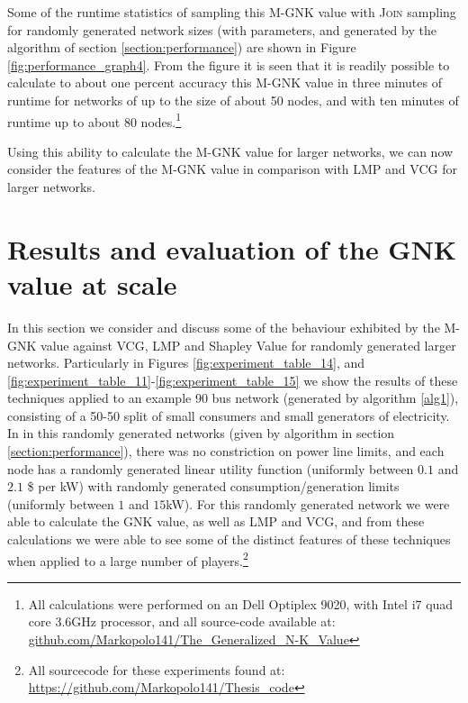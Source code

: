 Some of the runtime statistics of sampling this M-GNK value with \textsc{Join} sampling for randomly generated network sizes (with parameters, and generated by the algorithm of section \ref{section:performance}) are shown in Figure \ref{fig:performance_graph4}.
From the figure it is seen that it is readily possible to calculate to about one percent accuracy this M-GNK value in three minutes of runtime for networks of up to the size of about 50 nodes, and with ten minutes of runtime up to about 80 nodes.\footnote{\label{note1} All calculations were performed on an Dell Optiplex 9020, with Intel i7 quad core 3.6GHz processor, and all source-code available at:\\
\href{https://github.com/Markopolo141/The\_Generalized\_N-K\_Value}{github.com/Markopolo141/The\_Generalized\_N-K\_Value}}

Using this ability to calculate the M-GNK value for larger networks, we can now consider the features of the M-GNK value in comparison with LMP and VCG for larger networks.





\section{Results and evaluation of the GNK value at scale}\label{sec:results_and_evaluation_of_GNK}



In this section we consider and discuss some of the behaviour exhibited by the M-GNK value against VCG, LMP and Shapley Value for randomly generated larger networks.
Particularly in Figures \ref{fig:experiment_table_14}, and \ref{fig:experiment_table_11}-\ref{fig:experiment_table_15} we show the results of these techniques applied to an example 90 bus network (generated by algorithm \ref{alg1}), consisting of a 50-50 split of small consumers and small generators of electricity.
In in this randomly generated networks (given by algorithm in section \ref{section:performance}), there was no constriction on power line limits, and each node has a randomly generated linear utility function (uniformly between $0.1$ and $2.1$ \$ per kW) with randomly generated consumption/generation limits (uniformly between $1$ and $15$kW).
For this randomly generated network we were able to calculate the GNK value, as well as LMP and VCG, and from these calculations we were able to see some of the distinct features of these techniques when applied to a large number of players.\footnote{All sourcecode for these experiments found at: \href{https://github.com/Markopolo141/Thesis\_code}{https://github.com/Markopolo141/Thesis\_code}}

